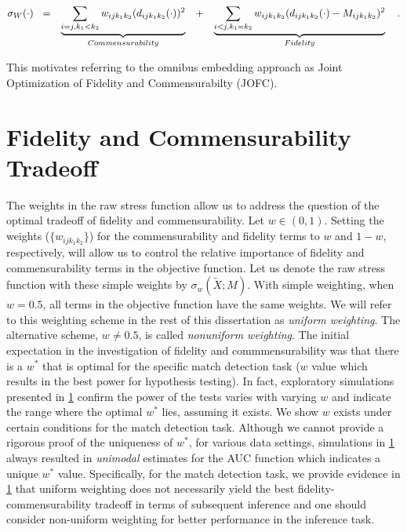 \documentclass[12pt,oneside,final]{thesis}\usepackage[]{graphicx}\usepackage[]{color}
\begin{document}
\begin{align}
\sigma_W(\cdot)\hspace{3pt}   
\hspace{3pt}&=&\underbrace{\sum_{i=j,k_1< k_2}  {w_{ij{k_1}{k_2}}(d_{ij{k_1}{k_2}}(\cdot))^2}}_{Commensurability}  \hspace{10pt}  &  +&\underbrace{\sum_{i< j,k_1=k_2}  {w_{ij{k_1}{k_2}}(d_{ij{k_1}{k_2}}(\cdot)-M_{ijk_1k_2})^2  }  } _{Fidelity}\notag\label{eq:FidCommSep}\hspace{10pt} .
\end{align}

This motivates  referring to the omnibus embedding approach as Joint Optimization of Fidelity and Commensurabilty (JOFC).


\section{Fidelity and Commensurability Tradeoff}
 The weights in the raw stress function allow us to address the question of the optimal tradeoff of  fidelity and commensurability. Let $w \in (0,1)$. Setting the weights ($\{w_{ijk_1k_2}\}$)  for the commensurability  and fidelity  terms    to $w$ and $1-w$, respectively,  will allow us to control the relative importance of fidelity and commensurability terms in the objective function. Let us denote the raw stress function with these simple weights by $\sigma_w(\widetilde{X};M)$.  With simple weighting, when $w=0.5$, all terms in the objective function have the same weights. We will refer to this weighting scheme in the rest of this dissertation as \emph{uniform weighting}. The alternative scheme, $w \neq 0.5$, is called \emph{nonuniform weighting}.
The initial  expectation in the investigation of fidelity and commmensurability was that there is a $w^*$ that is optimal for the specific match detection task ($w$ value which results in the best power for hypothesis testing). In fact,  exploratory simulations presented in \ref{} confirm the power of the tests varies with varying $w$ and indicate the range where the optimal  $w^*$ lies, assuming it exists. We show $w$ exists under certain conditions for the match detection task. Although we cannot provide  a rigorous proof of the uniqueness of $w^*$, for various data settings, simulations in \ref{} always resulted in \emph{unimodal}  estimates for the AUC function which indicates a unique $w^*$ value.
Specifically,  for the match detection task, we provide evidence in \ref{} that  uniform weighting does not necessarily yield the best fidelity-commensurability tradeoff in terms of subsequent inference and one should consider non-uniform weighting for better performance in the inference task.
\end{document}

